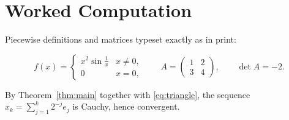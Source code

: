 \documentclass{article}
\theoremstyle{definition}
\theoremstyle{remark}
\begin{document}
\section{Worked Computation}

Piecewise definitions and matrices typeset exactly as in print:

\[
  f(x) =
  \begin{cases}
    x^2 \sin\frac{1}{x} & x \neq 0,\\
    0 & x = 0,
  \end{cases}
  \qquad
  A =
  \begin{pmatrix}
    1 & 2 \\
    3 & 4
  \end{pmatrix},
  \qquad
  \det A = -2.
\]

By Theorem~\ref{thm:main} together with \eqref{eq:triangle}, the sequence
$x_k = \sum_{j=1}^{k} 2^{-j} e_j$ is Cauchy, hence convergent.
\end{document}
